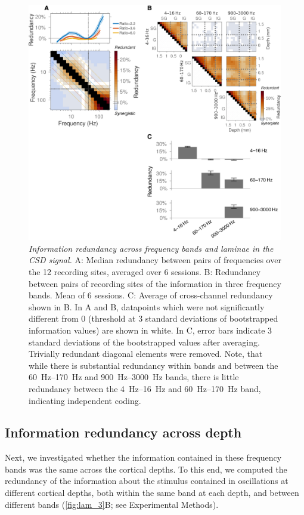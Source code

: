 \begin{figure}[htbp]
\centering \includegraphics[width=\columnwidth]{paperfigs/fig3}
%
\caption{%
\textit{Information redundancy across frequency bands and laminae in the CSD signal.}
A: Median redundancy between pairs of frequencies over the \num{12} recording sites, averaged over \num{6} sessions.
B: Redundancy between pairs of recording sites of the information in three frequency bands. Mean of \num{6} sessions.
C: Average of cross-channel redundancy shown in B.
In A and B, datapoints which were not significantly different from $0$ (threshold at \num{3} standard deviations of bootstrapped information values) are shown in white.
In C, error bars indicate \num{3} standard deviations of the bootstrapped values after averaging.
Trivially redundant diagonal elements were removed.
Note, that while there is substantial redundancy within bands and between the \SIrange{60}{170}{Hz} and \SIrange{900}{3000}{Hz} bands, there is little redundancy between the \SIrange{4}{16}{Hz} and \SIrange{60}{170}{Hz} band, indicating independent coding.
}%
\label{fig:lam_3}
%
\end{figure}


\subsection{Information redundancy across depth}

Next, we investigated whether the information contained in these frequency bands was the same across the cortical depths.
To this end, we computed the redundancy of the information about the stimulus contained in oscillations at different cortical depths, both within the same band at each depth, and between different bands (\autoref{fig:lam_3}B; see Experimental Methods).

